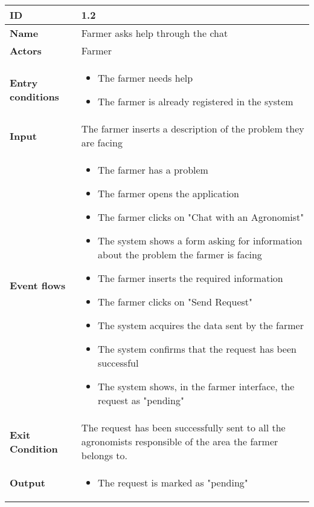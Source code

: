 \begin{longtable}[H]{ | l | p{10cm} | }
\hline
{\cellcolor[rgb]{0.753,0.753,0.753}}\textbf{ID}  & 1.2 \\ \hline
{\cellcolor[rgb]{0.753,0.753,0.753}}\textbf{Name} & Farmer asks help through the chat \\ \hline
{\cellcolor[rgb]{0.753,0.753,0.753}}\textbf{Actors} & Farmer \\ \hline
{\cellcolor[rgb]{0.753,0.753,0.753}}\textbf{Entry conditions} &
\begin{itemize}
    \item The farmer needs help
    \item The farmer is already registered in the system
\end{itemize}
\\ \hline
{\cellcolor[rgb]{0.753,0.753,0.753}}\textbf{Input} & The farmer inserts a description of the problem they are facing\\ \hline
{\cellcolor[rgb]{0.753,0.753,0.753}}\textbf{Event flows} &
\begin{itemize}
    \item The farmer has a problem
    \item The farmer opens the application
    \item The farmer clicks on "Chat with an Agronomist"
    \item The system shows a form asking for information about the problem the farmer is facing
    \item The farmer inserts the required information
    \item The farmer clicks on "Send Request"
    \item The system acquires the data sent by the farmer
    \item The system confirms that the request has been successful
    \item The system shows, in the farmer interface, the request as "pending"
\end{itemize}
\\ \hline
{\cellcolor[rgb]{0.753,0.753,0.753}}\textbf{Exit Condition} & The request has been successfully sent to all the agronomists responsible of the area the farmer belongs to.\\ \hline
{\cellcolor[rgb]{0.753,0.753,0.753}}\textbf{Output} & 
\begin{itemize}
    \item The request is marked as "pending"
\end{itemize}
\\ \hline

\end{longtable}
